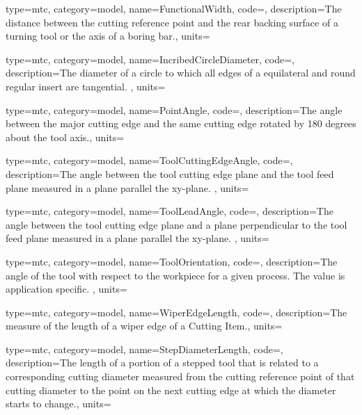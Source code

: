 {
  type=mtc,
  category=model,
  name={FunctionalWidth},
  code=,
  description={The distance between the cutting reference point and the rear backing surface of a turning tool or the axis of a boring bar.},
  units=
}


{
  type=mtc,
  category=model,
  name={IncribedCircleDiameter},
  code=,
  description={The diameter of a circle to which all edges of a equilateral and round regular insert are tangential. },
  units=
}


{
  type=mtc,
  category=model,
  name={PointAngle},
  code=,
  description={The angle between the major cutting edge and the same cutting edge rotated by 180 degrees about the tool axis.},
  units=
}


{
  type=mtc,
  category=model,
  name={ToolCuttingEdgeAngle},
  code=,
  description={The angle between the tool cutting edge plane and the tool feed plane measured in a plane parallel the xy-plane. },
  units=
}


{
  type=mtc,
  category=model,
  name={ToolLeadAngle},
  code=,
  description={The angle between the tool cutting edge plane and a plane perpendicular to the tool feed plane measured in a plane parallel the xy-plane. },
  units=
}


{
  type=mtc,
  category=model,
  name={ToolOrientation},
  code=,
  description={The angle of the tool with respect to the workpiece for a given process. The value is application specific. },
  units=
}


{
  type=mtc,
  category=model,
  name={WiperEdgeLength},
  code=,
  description={The measure of the length of a wiper edge of a Cutting Item.},
  units=
}


{
  type=mtc,
  category=model,
  name={StepDiameterLength},
  code=,
  description={The length of a portion of a stepped tool that is related to a corresponding cutting diameter measured from the cutting reference point of that cutting diameter to the point on the next cutting edge at which the diameter starts to change.},
  units=
}


